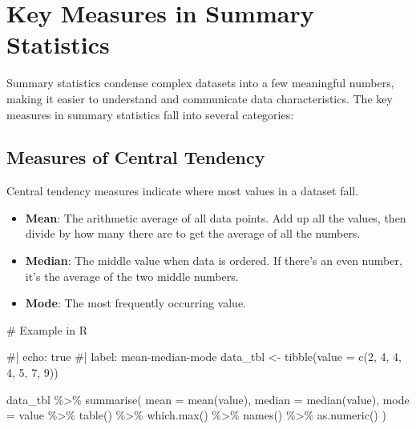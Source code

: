 \documentclass[
  man,
  floatsintext,
  longtable,
  nolmodern,
  notxfonts,
  notimes,
  colorlinks=true,linkcolor=blue,citecolor=blue,urlcolor=blue]{apa7}
\newenvironment{Shaded}{\begin{snugshade}}{\end{snugshade}}
\newcommand{\AttributeTok}[1]{\textcolor[rgb]{0.40,0.45,0.13}{#1}}
\newcommand{\CommentTok}[1]{\textcolor[rgb]{0.37,0.37,0.37}{#1}}
\newcommand{\DecValTok}[1]{\textcolor[rgb]{0.68,0.00,0.00}{#1}}
\newcommand{\FunctionTok}[1]{\textcolor[rgb]{0.28,0.35,0.67}{#1}}
\newcommand{\NormalTok}[1]{\textcolor[rgb]{0.00,0.23,0.31}{#1}}
\newcommand{\OtherTok}[1]{\textcolor[rgb]{0.00,0.23,0.31}{#1}}
\newcommand{\SpecialCharTok}[1]{\textcolor[rgb]{0.37,0.37,0.37}{#1}}
\begin{document}
\newpage

\section{Key Measures in Summary
Statistics}\label{key-measures-in-summary-statistics}

Summary statistics condense complex datasets into a few meaningful
numbers, making it easier to understand and communicate data
characteristics. The key measures in summary statistics fall into
several categories:

\subsection{Measures of Central
Tendency}\label{measures-of-central-tendency}

Central tendency measures indicate where most values in a dataset fall.

\begin{itemize}
\item
  \textbf{Mean}: The arithmetic average of all data points. Add up all
  the values, then divide by how many there are to get the average of
  all the numbers.
\item
  \textbf{Median}: The middle value when data is ordered. If there's an
  even number, it's the average of the two middle numbers.
\item
  \textbf{Mode}: The most frequently occurring value.
\end{itemize}

\begin{Shaded}
\begin{Highlighting}[]
\CommentTok{\# Example in R}

\CommentTok{\#| echo: true}
\CommentTok{\#| label: mean{-}median{-}mode}
\NormalTok{data\_tbl }\OtherTok{\textless{}{-}} \FunctionTok{tibble}\NormalTok{(}\AttributeTok{value =} \FunctionTok{c}\NormalTok{(}\DecValTok{2}\NormalTok{, }\DecValTok{4}\NormalTok{, }\DecValTok{4}\NormalTok{, }\DecValTok{4}\NormalTok{, }\DecValTok{5}\NormalTok{, }\DecValTok{7}\NormalTok{, }\DecValTok{9}\NormalTok{))}

\NormalTok{data\_tbl }\SpecialCharTok{\%\textgreater{}\%}
  \FunctionTok{summarise}\NormalTok{(}
    \AttributeTok{mean =} \FunctionTok{mean}\NormalTok{(value),}
    \AttributeTok{median =} \FunctionTok{median}\NormalTok{(value),}
    \AttributeTok{mode =}\NormalTok{ value }\SpecialCharTok{\%\textgreater{}\%} 
      \FunctionTok{table}\NormalTok{() }\SpecialCharTok{\%\textgreater{}\%} 
      \FunctionTok{which.max}\NormalTok{() }\SpecialCharTok{\%\textgreater{}\%} 
      \FunctionTok{names}\NormalTok{() }\SpecialCharTok{\%\textgreater{}\%} 
      \FunctionTok{as.numeric}\NormalTok{()}
\NormalTok{  )}
\end{Highlighting}
\end{Shaded}
\end{document}
